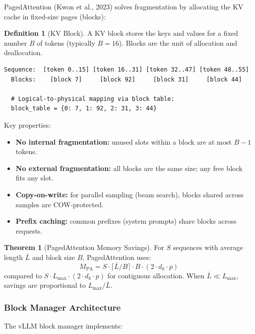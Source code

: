 \documentclass[11pt,a4paper]{article}
\theoremstyle{definition}
\newtheorem{definition}{Definition}[section]
\newtheorem{theorem}{Theorem}[section]
\begin{document}
PagedAttention (Kwon et al., 2023) solves fragmentation by allocating the KV cache in fixed-size pages (blocks):

\begin{definition}[KV Block]
	A KV block stores the keys and values for a fixed number $B$ of tokens (typically $B = 16$). Blocks are the unit of allocation and deallocation.
\end{definition}

\begin{lstlisting}[caption=Block table for a single sequence]
  Sequence:  [token 0..15] [token 16..31] [token 32..47] [token 48..55]
  Blocks:    [block 7]     [block 92]     [block 31]     [block 44]

  # Logical-to-physical mapping via block table:
  block_table = {0: 7, 1: 92, 2: 31, 3: 44}
\end{lstlisting}

Key properties:
\begin{itemize}
	\item \textbf{No internal fragmentation:} unused slots within a block are at most $B-1$ tokens.
	\item \textbf{No external fragmentation:} all blocks are the same size; any free block fits any slot.
	\item \textbf{Copy-on-write:} for parallel sampling (beam search), blocks shared across samples are COW-protected.
	\item \textbf{Prefix caching:} common prefixes (system prompts) share blocks across requests.
\end{itemize}

\begin{theorem}[PagedAttention Memory Savings]
	For $S$ sequences with average length $\bar{L}$ and block size $B$, PagedAttention uses:
	\begin{equation}
		M_{\text{PA}} = S \cdot \lceil \bar{L} / B \rceil \cdot B \cdot (2 \cdot d_k \cdot p)
	\end{equation}
	compared to $S \cdot L_{\max} \cdot (2 \cdot d_k \cdot p)$ for contiguous allocation. When $\bar{L} \ll L_{\max}$, savings are proportional to $L_{\max} / \bar{L}$.
\end{theorem}

\subsubsection{Block Manager Architecture}

The vLLM block manager implements:
\end{document}

